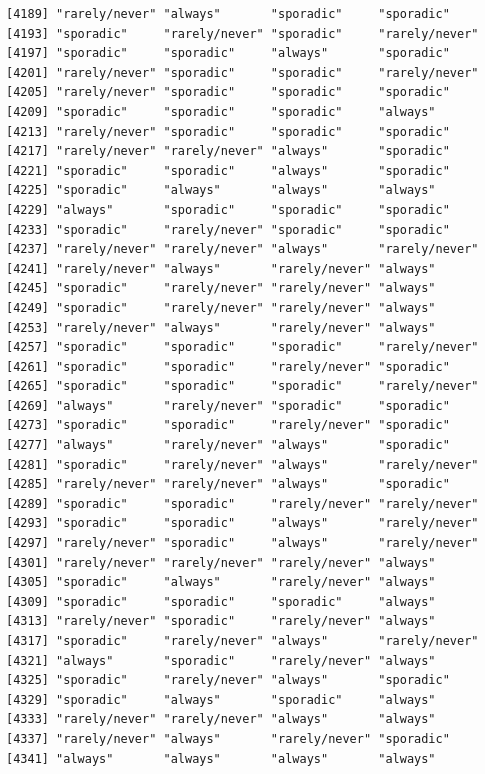 \documentclass[
  letterpaper,
  DIV=11,
  numbers=noendperiod]{scrartcl}
\begin{document}
\begin{verbatim}
[4189] "rarely/never" "always"       "sporadic"     "sporadic"    
[4193] "sporadic"     "rarely/never" "sporadic"     "rarely/never"
[4197] "sporadic"     "sporadic"     "always"       "sporadic"    
[4201] "rarely/never" "sporadic"     "sporadic"     "rarely/never"
[4205] "rarely/never" "sporadic"     "sporadic"     "sporadic"    
[4209] "sporadic"     "sporadic"     "sporadic"     "always"      
[4213] "rarely/never" "sporadic"     "sporadic"     "sporadic"    
[4217] "rarely/never" "rarely/never" "always"       "sporadic"    
[4221] "sporadic"     "sporadic"     "always"       "sporadic"    
[4225] "sporadic"     "always"       "always"       "always"      
[4229] "always"       "sporadic"     "sporadic"     "sporadic"    
[4233] "sporadic"     "rarely/never" "sporadic"     "sporadic"    
[4237] "rarely/never" "rarely/never" "always"       "rarely/never"
[4241] "rarely/never" "always"       "rarely/never" "always"      
[4245] "sporadic"     "rarely/never" "rarely/never" "always"      
[4249] "sporadic"     "rarely/never" "rarely/never" "always"      
[4253] "rarely/never" "always"       "rarely/never" "always"      
[4257] "sporadic"     "sporadic"     "sporadic"     "rarely/never"
[4261] "sporadic"     "sporadic"     "rarely/never" "sporadic"    
[4265] "sporadic"     "sporadic"     "sporadic"     "rarely/never"
[4269] "always"       "rarely/never" "sporadic"     "sporadic"    
[4273] "sporadic"     "sporadic"     "rarely/never" "sporadic"    
[4277] "always"       "rarely/never" "always"       "sporadic"    
[4281] "sporadic"     "rarely/never" "always"       "rarely/never"
[4285] "rarely/never" "rarely/never" "always"       "sporadic"    
[4289] "sporadic"     "sporadic"     "rarely/never" "rarely/never"
[4293] "sporadic"     "sporadic"     "always"       "rarely/never"
[4297] "rarely/never" "sporadic"     "always"       "rarely/never"
[4301] "rarely/never" "rarely/never" "rarely/never" "always"      
[4305] "sporadic"     "always"       "rarely/never" "always"      
[4309] "sporadic"     "sporadic"     "sporadic"     "always"      
[4313] "rarely/never" "sporadic"     "rarely/never" "always"      
[4317] "sporadic"     "rarely/never" "always"       "rarely/never"
[4321] "always"       "sporadic"     "rarely/never" "always"      
[4325] "sporadic"     "rarely/never" "always"       "sporadic"    
[4329] "sporadic"     "always"       "sporadic"     "always"      
[4333] "rarely/never" "rarely/never" "always"       "always"      
[4337] "rarely/never" "always"       "rarely/never" "sporadic"    
[4341] "always"       "always"       "always"       "always"      

\end{verbatim}
\end{document}
